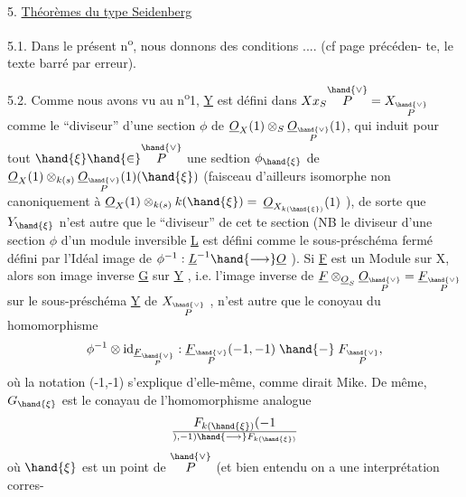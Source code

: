 
5. \uline{Th\'eor\`emes du type Seidenberg}

5.1.
Dans le pr\'esent n\textsuperscript{o}, nous donnons des conditions .... (cf page pr\'ec\'eden-%
te, le texte barr\'e par erreur).

5.2. Comme nous avons vu au n\textsuperscript{o}1, \underline{Y} est d\'efini dans $X x_S \overset{\hand{\vee}}{P} = X_{\overset{\hand{\vee}}{P}}$
comme le ``diviseur'' d'une section $\phi$ de $\underline{O}_X(1)\otimes_S \underline{O}_{\overset{\hand{\vee}}{P}}(1)$, qui induit pour
tout $\hand{\xi} \hand{\in} \overset{\hand{\vee}}{P}$ une sedtion $\phi_{\hand{\xi}}$ de  $\underline{O}_X(1)\otimes_{k(s)}\underline{O}_{\overset{\hand{\vee}}{P}}(1)(\hand{\xi})$
(faisceau d'ailleurs isomorphe non canoniquement \`a $\underline{O}_X(1)\otimes_{k(s)}k(\hand{\xi}) =$
$\underline{O}_{X_{k(\hand{\xi})}}(1)$ ), de sorte que $Y_{\hand{\xi}}$ n'est autre que le  ``diviseur'' de cet
te section (NB le diviseur d'une section $\phi$ d'un module inversible \underline{L} \margin{$/\!/$}
est d\'efini comme le sous-pr\'esch\'ema ferm\'e d\'efini par l'Id\'eal image de
$\phi^{-1} : \underline{L}^{-1} \hand{\longrightarrow} \underline{O}$ ). Si \underline{F} est un Module sur X, alors son image inverse \underline{G}
sur \underline{Y} , i.e. l'image inverse de $\underline{F}\otimes_{\underline{O}_S}\underline{O}_{\overset{\hand{\vee}}{P}} = \underline{F}_{\overset{\hand{\vee}}{P}}$ sur le sous-pr\'esch\'ema \underline{Y} de
$X_{\overset{\hand{\vee}}{P}}$ , n'est autre que le conoyau du homomorphisme
\[ \phi^{-1}\otimes \mathrm{id}_{\underline{F}_{\overset{\hand{\vee}}{P}}} : \underline{F}_{\overset{\hand{\vee}}{P}}(-1,-1) \mathrel{\hand{-}} F_{\overset{\hand{\vee}}{P}} , \]
o\`u la notation (-1,-1) s'explique d'elle-m\^eme, comme dirait Mike. De
m\^eme, $G_{\hand{\xi}}$ est le conayau de l'homomorphisme analogue
\[ F_{k(\hand{\xi})}(-1\over{)}{,}-1) \hand{\longrightarrow} F_{k(\hand{\xi})} \]
o\`u $\hand{\xi}$ est un point de $\overset{\hand{\vee}}{P}$ (et bien entendu on a une interpr\'etation corres-%
